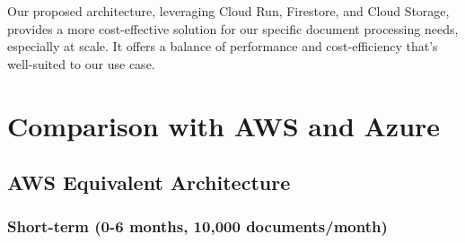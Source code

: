 \documentclass[a4paper, 12pt]{report}
\begin{document}
Our proposed architecture, leveraging Cloud Run, Firestore, and Cloud Storage, provides a more cost-effective solution for our specific document processing needs, especially at scale. It offers a balance of performance and cost-efficiency that's well-suited to our use case.

\section{Comparison with AWS and Azure}

\subsection{AWS Equivalent Architecture}

\subsubsection{Short-term (0-6 months, 10,000 documents/month)}
\end{document}
